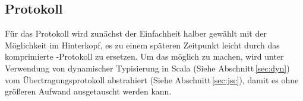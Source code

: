 \subsection{Protokoll}

Für das Protokoll wird zunächst der Einfachheit halber  gewählt mit der Möglichkeit im
Hinterkopf, es zu einem späteren Zeitpunkt leicht durch das komprimierte -Protokoll
\cite{bson} zu ersetzen. Um das möglich zu machen, wird unter Verwendung von dynamischer Typisierung
in Scala (Siehe Abschnitt\,\ref{sec:dyn}) vom Übertragungsprotokoll abstrahiert (Siehe
Abschnitt\,\ref{sec:jsc}), damit es ohne größeren Aufwand ausgetauscht werden kann.
